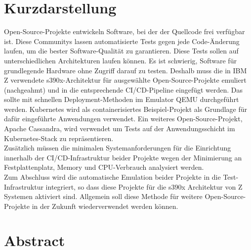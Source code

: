 \thispagestyle{empty}
\section*{Kurzdarstellung}
\label{sec:kurzdarstellung}
Open-Source-Projekte entwickeln Software, bei der der Quellcode frei verfügbar ist. Diese Communitys lassen automatisierte Tests gegen jede Code-Änderung laufen, um die bester Software-Qualität zu garantieren. 
Diese Tests sollen auf unterschiedlichen Architekturen laufen können. Es ist schwierig, Software für grundlegende Hardware ohne Zugriff darauf zu testen. Deshalb muss die in IBM Z verwendete s390x-Architektur für ausgewählte Open-Source-Projekte emuliert (nachgeahmt) und in die entsprechende CI/CD-Pipeline eingefügt werden. 
Das sollte mit schnellen Deployment-Methoden im Emulator QEMU durchgeführt werden. 
Kubernetes wird als containerisiertes Beispiel-Projekt als Grundlage für dafür eingeführte Anwendungen verwendet. Ein weiteres Open-Source-Projekt, Apache Cassandra, wird verwendet um Tests auf der Anwendungsschicht im Kubernetes-Stack zu repräsentieren. \\
Zusätzlich müssen die minimalen Systemanforderungen für die Einrichtung innerhalb der CI/CD-Infrastruktur beider Projekte wegen der Minimierung an Festplattenplatz, Memory und CPU-Verbrauch analysiert werden. \\
Zum Abschluss wird die automatische Emulation beider Projekte in die Test-Infrastruktur integriert, so dass diese Projekte für die s390x Architektur von Z Systemen aktiviert sind. Allgemein soll diese Methode für weitere Open-Source-Projekte in der Zukunft wiederverwendet werden können.



\section*{Abstract}
\label{sec:abstract}

